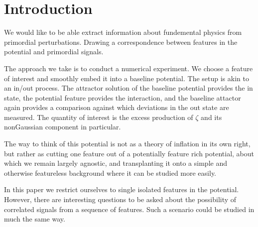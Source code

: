 
\section{Introduction} \label{sec:intro}

We would like to be able extract information about fundemental physics from primordial perturbations.
Drawing a correspondence between features in the potential and primordial signals.

The approach we take is to conduct a numerical experiment.
We choose a feature of interest and smoothly embed it into a baseline potential.
The setup is akin to an in/out process. The attractor solution of the baseline potential provides the in state, the potential feature provides the interaction, and the baseline attactor again provides a comparison against which deviations in the out state are measured.
The quantity of interest is the excess production of $\zeta$ and its nonGaussian component in particular.

The way to think of this potential is not as a theory of inflation in its own right, but rather as cutting one feature out of a potentially feature rich potential, about which we remain largely agnostic, and transplanting it onto a simple and otherwise featureless background where it can be studied more easily.

In this paper we restrict ourselves to single isolated features in the potential. However, there are interesting questions to be asked about the possibility of correlated signals from a sequence of features. Such a scenario could be studied in much the same way.

